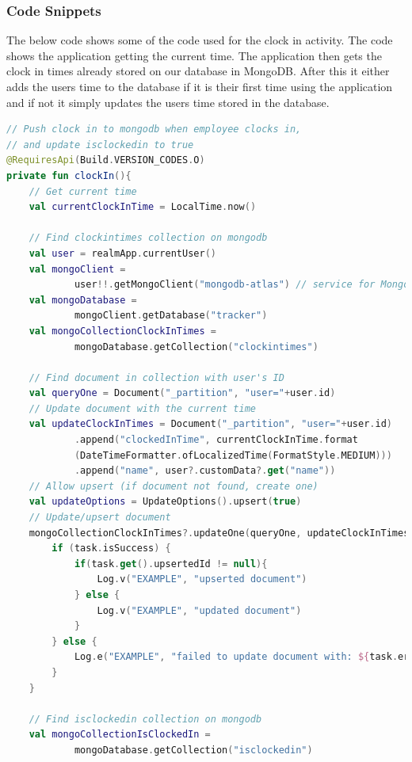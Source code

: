 \subsubsection{Code Snippets}
The below code shows some of the code used for the clock in activity. The code shows the application getting the current time. The application then gets the clock in times already stored on our database in MongoDB. After this it either adds the users time to the database if it is their first time using the application and if not it simply updates the users time stored in the database.
\begin{lstlisting}[caption={Clock In code}, label={lst:example1}, language=Kotlin]
// Push clock in to mongodb when employee clocks in,
// and update isclockedin to true
@RequiresApi(Build.VERSION_CODES.O)
private fun clockIn(){
    // Get current time
    val currentClockInTime = LocalTime.now()

    // Find clockintimes collection on mongodb
    val user = realmApp.currentUser()
    val mongoClient =
            user!!.getMongoClient("mongodb-atlas") // service for MongoDB Atlas cluster containing custom user data
    val mongoDatabase =
            mongoClient.getDatabase("tracker")
    val mongoCollectionClockInTimes =
            mongoDatabase.getCollection("clockintimes")

    // Find document in collection with user's ID
    val queryOne = Document("_partition", "user="+user.id)
    // Update document with the current time
    val updateClockInTimes = Document("_partition", "user="+user.id)
            .append("clockedInTime", currentClockInTime.format
            (DateTimeFormatter.ofLocalizedTime(FormatStyle.MEDIUM)))
            .append("name", user?.customData?.get("name"))
    // Allow upsert (if document not found, create one)
    val updateOptions = UpdateOptions().upsert(true)
    // Update/upsert document
    mongoCollectionClockInTimes?.updateOne(queryOne, updateClockInTimes, updateOptions)?.getAsync { task ->
        if (task.isSuccess) {
            if(task.get().upsertedId != null){
                Log.v("EXAMPLE", "upserted document")
            } else {
                Log.v("EXAMPLE", "updated document")
            }
        } else {
            Log.e("EXAMPLE", "failed to update document with: ${task.error}")
        }
    }

    // Find isclockedin collection on mongodb
    val mongoCollectionIsClockedIn =
            mongoDatabase.getCollection("isclockedin")


\end{lstlisting}

